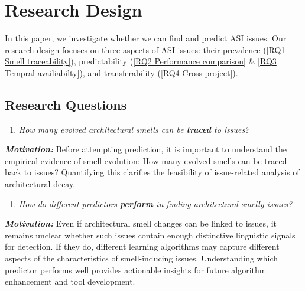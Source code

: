 \section{Research Design}
In this paper, we investigate whether we can find and predict \acl{ASI} issues.
Our research design focuses on three aspects of \ac{ASI} issues: their prevalence (\ref{RQ1 Smell traceability}), predictability (\ref{RQ2 Performance comparison} \& \ref{RQ3 Tempral availiabilty}), and transferability (\ref{RQ4 Cross project}).

\label{s:research_design}


\subsection{Research Questions}
\begin{enumerate}[leftmargin=*, labelindent=0em, label=\textbf{RQ\arabic*}:, ref=RQ\arabic*, series=researchQuestions]
    \item \label{RQ1 Smell traceability} \emph{How many evolved architectural smells can be \textbf{traced} to issues?}
\end{enumerate}
\emph{\textbf{Motivation:}} Before attempting prediction, it is important to understand the empirical evidence of smell evolution:
How many evolved smells can be traced back to issues?
Quantifying this clarifies the feasibility of issue-related analysis of architectural decay.
\begin{enumerate}[leftmargin=*, labelindent=0em, label=\textbf{RQ\arabic*}:, ref=RQ\arabic*, series=researchQuestions, resume]
    \item \label{RQ2 Performance comparison}  \emph{How do different predictors \textbf{perform} in finding architectural smelly issues?}
\end{enumerate}
\textbf{\emph{Motivation:}} Even if architectural smell changes can be linked to issues, it remains unclear whether such issues contain enough distinctive linguistic signals for detection. %
If they do, different learning algorithms may capture different aspects of the characteristics of smell-inducing issues.
Understanding which predictor performs well provides actionable insights for future algorithm enhancement and tool development.

